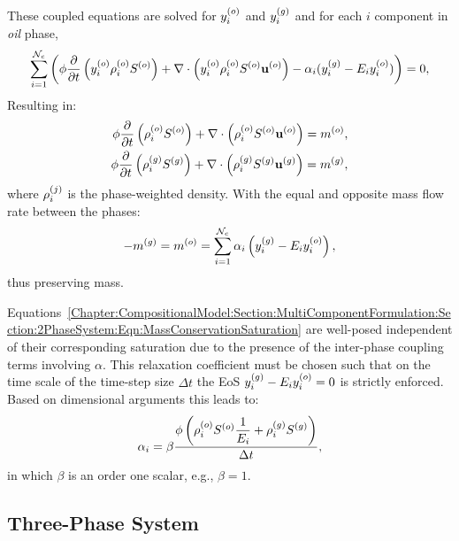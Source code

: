 These coupled equations are solved for $\mfr[y]{i}{o}$ and $\mfr[y]{i}{g}$ and for each $i$ component in {\it oil} phase, 
           \begin{equation}
              \summation_{i=1}^{{\cal N}_{c}} \bigg(\phi \displaystyle\frac{\partial}{\partial t}\left(\mfr[y]{i}{o}\mfr[\rho]{i}{o}\mfr[S]{}{o} \right) + \nabla\cdot\left(\mfr[y]{i}{o}\mfr[\rho]{i}{o}\mfr[S]{}{o}\mfr[\mathbf{u}]{}{o}  \right) - \alpha_i (\mfr[y]{i}{g} - E_i \mfr[y]{i}{o})\bigg)  = 0, 
           \end{equation}
Resulting in:
           \begin{eqnarray}
              \phi \displaystyle\frac{\partial}{\partial t}\left( \mfr[\rho]{i}{o}\mfr[S]{}{o} \right) + \nabla\cdot\left(\mfr[\rho]{i}{o}\mfr[S]{}{o}\mfr[\mathbf{u}]{}{o}  \right) = \mfr[m]{}{o}, \nonumber \\
              \phi \displaystyle\frac{\partial}{\partial t}\left( \mfr[\rho]{i}{g}\mfr[S]{}{g} \right) + \nabla\cdot\left(\mfr[\rho]{i}{g}\mfr[S]{}{g}\mfr[\mathbf{u}]{}{g}  \right) = \mfr[m]{}{g}, \nonumber 
           \end{eqnarray}
where $\mfr[\rho]{i}{j}$ is the phase-weighted density. With the equal and opposite mass flow rate between the phases: 
           \begin{displaymath}
                -\mfr[m]{}{g} = \mfr[m]{}{o}= \summation_{i=1}^{{\cal N}_{c}}\alpha_i \left(\mfr[y]{i}{g} - E_i \mfr[y]{i}{o}\right), 
           \end{displaymath}
thus preserving mass.


Equations~\ref{Chapter:CompositionalModel:Section:MultiComponentFormulation:Section:2PhaseSystem:Eqn:MassConservationSaturation} are well-posed independent of their corresponding saturation due to the presence of the inter-phase coupling terms involving $\alpha$. This relaxation coefficient \blue{$\alpha$} must be chosen such that on the time scale of the time-step size $\Delta t$ the EoS $\mfr[y]{i}{g} - E_i \mfr[y]{i}{o}=0$ is strictly enforced. Based on dimensional arguments this leads to: 
            \begin{equation}
               \alpha_{i}= \beta \frc{\phi \left(\mfr[\rho]{i}{o}\mfr[S]{}{o} \frc{1}{E_i} +\mfr[\rho]{i}{g}\mfr[S]{}{g} \right)}{\Delta t} ,
            \end{equation}
in which $\beta$ is an order one scalar, e.g., $\beta=1$.


\subsection{Three-Phase System}\label{Chapter:CompositionalModel:Section:MultiComponentFormulation:Section:3PhaseSystem}


